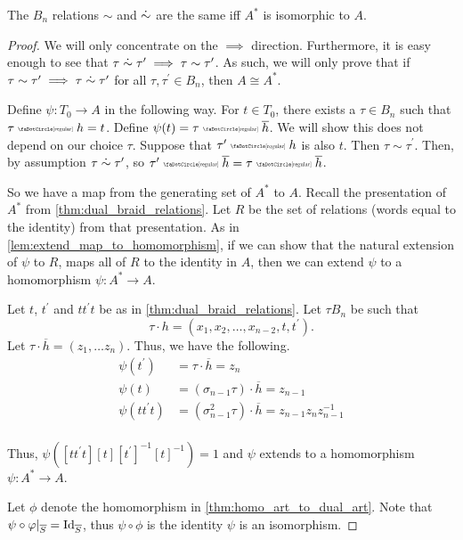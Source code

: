 \begin{theorem}
	The $B_n$ relations $\sim$ and $\mathrel{\dot{\sim}}$ are the same iff $A^*$ is isomorphic to $A$.
	\label{thm:resteghini_proof}
\end{theorem}
\begin{proof}
	We will only concentrate on the $\implies$ direction. Furthermore, it is easy enough to see that $\tau \mathrel{\dot{\sim}} \tau^\prime \implies \tau \sim \tau^\prime$.
	As such, we will only prove that if $\tau \sim \tau^\prime \implies \tau \mathrel{\dot{\sim}} \tau^\prime$ for all $\tau,\tau^\prime \in B_n$, then $A\cong A^*$.

	Define $\psi \colon T_0 \to A$ in the following way.
	For $t \in T_0$, there exists a $\tau \in B_n$ such that $\tau \codot h = t$.
	Define  $\psi(t) = \tau \codot \overline{h}$.
	We will show this does not depend on our choice $\tau$.
	Suppose that $\tau^\prime \codot h$ is also $t$.
	Then  $\tau \sim \tau^\prime$.
	Then, by assumption $\tau \mathrel{\dot{\sim}} \tau^\prime$, so $\tau^\prime\codot \overline{h} = \tau \codot\overline{h}$.

	So we have a map from the generating set of $A^*$ to $A$.
	Recall the presentation of $A^*$ from \cref{thm:dual_braid_relations}.
	Let $R$ be the set of relations (words equal to the identity) from that presentation.
	As in \cref{lem:extend_map_to_homomorphism}, if we can show that the natural extension of $\psi$ to $R$, maps all of $R$ to the identity in $A$, then we can extend $\psi$ to a homomorphism $\psi \colon A^* \to A$.

	Let $t$, $t^\prime$ and $t t^\prime t$ be as in \cref{thm:dual_braid_relations}.
	Let $\tau B_n$ be such that
	\[
		\tau \cdot h = (x_1, x_2, \ldots, x_{n-2}, t, t^\prime)
		.\]
	Let $\tau \cdot \overline{h} = (z_1, \ldots z_n)$.
	Thus, we have the following.
	\begin{align*}
		\psi(t^\prime)     & = \tau \cdot \overline{h} = z_n                                    \\
		\psi(t)            & = (\sigma_{n-1}\tau) \cdot \overline{h} = z_{n-1}                  \\
		\psi(t t^\prime t) & = (\sigma_{n-1}^2\tau) \cdot \overline{h} = z_{n-1}z_nz_{n-1}^{-1} \\
	\end{align*}

	Thus, $\psi( [t t^\prime t][t][t^\prime]^{-1}[t]^{-1} ) = 1$ and $\psi$ extends to a homomorphism $\psi \colon A^* \to A$.

	Let $\phi$ denote the homomorphism in \cref{thm:homo_art_to_dual_art}.
	Note that $\psi \circ \varphi |_{\overline{S}} = \operatorname{Id}_{\overline{S}}$, thus  $\psi \circ \phi$ is the identity $\psi$ is an isomorphism.
\end{proof}

